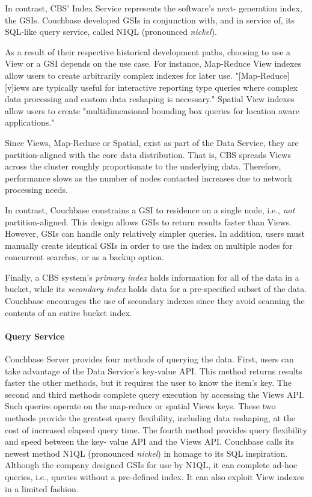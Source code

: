 \documentclass[9pt,twocolumn,twoside]{styles/osajnl}
\newcommand{\TODO}[2][]{\todo[color=red!10,inline,#1]{#2}}
\newcommand{\SE}{\TODO{Spelling}}
\newcommand{\CE}{\TODO{Citation}}
\begin{document}
In contrast, CBS' Index Service represents the software's next-
generation index, the GSIs.  Couchbase developed GSIs in conjunction with, and
in service of, its SQL-like query service, called N1QL (pronounced
\textit{nickel}). \CE

As a result of their respective historical development paths, choosing to use a
View or a GSI depends on the use case. For instance, Map-Reduce View indexes
allow users to create arbitrarily complex indexes for later use.  "[Map-Reduce]
[v]iews are typically useful for interactive reporting type queries where
complex data processing and custom data reshaping is necessary."  \CE Spatial View indexes allow users to create "multidimensional bounding box queries for location aware applications." \cite{www-viewsindexing-cbsinc}

Since Views, Map-Reduce or Spatial, exist as part of the Data Service, they are
partition-aligned with the core data distribution.  That is, CBS spreads Views
across the cluster roughly proportionate to the underlying data.  Therefore,
performance slows as the number of nodes contacted increases due to network
processing needs.

In contrast, Couchbase constrains a GSI to residence on a single node, i.e.,
\textit{not} partition-aligned.  This design allows GSIs to return results
faster than Views.  However, GSIs can handle only relatively simpler queries.
In addition, users must manually create identical GSIs in order to use
the index on multiple nodes for concurrent searches, or as a backup option.

Finally, a CBS system's \textit{primary index} holds information for all of the data
in a bucket, while its \textit{secondary index} holds data for a pre-specified
subset of the data. Couchbase encourages the use of secondary indexes since they
avoid scanning the contents of an entire bucket index.

\paragraph{Query Service} Couchbase Server provides four methods of querying
the data.  First, users can take advantage of the Data Service's key-value API.
This method returns results faster the other methods, but it requires the user
to know the item's key.  The second and third methods complete query execution
by accessing the Views API.  Such queries operate on the map-reduce or spatial
Views keys.  These two methods provide the greatest query flexibility, including
data reshaping, at the cost of increased elapsed query time.  The fourth method
provides query flexibility and speed between the key- value \SE API and the Views
API.  Couchbase calls its newest method N1QL (pronounced \textit{nickel})
\TODO{mentioned in previous paragraph}in
homage to its SQL inspiration. Although the company designed GSIs for use by
N1QL, it can complete ad-hoc queries, i.e., queries without a pre-defined index.
It can also exploit View indexes in a limited fashion.
\end{document}
